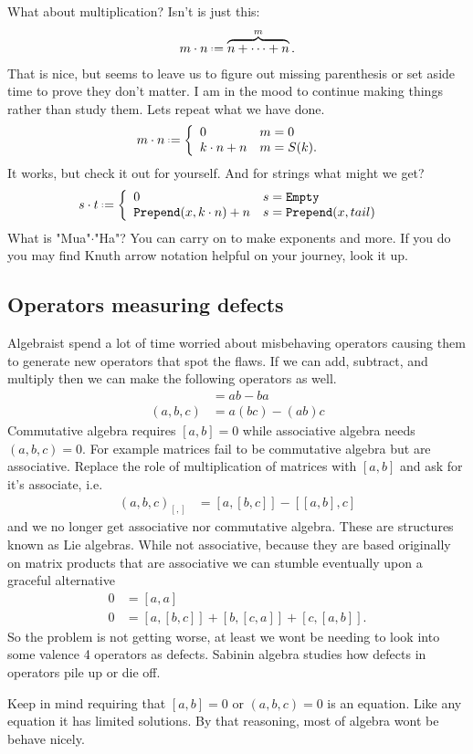 What about multiplication? Isn't is just this:
\begin{align*}
    m\cdot n\defeq \overbrace{n+\cdots +n}^m.
\end{align*}
That is nice, but seems to leave us to figure out missing parenthesis or set aside 
time to prove they don't matter.  I am in the mood to continue making things rather 
than study them.  Lets repeat what we have done.
\begin{align*}
    m\cdot n & \defeq \left\{
        \begin{array}{ll}
            0 & m=0\\
            k\cdot n+n & m=S(k).
        \end{array}
    \right.
\end{align*}
It works, but check it out for yourself.  And for strings what might we get?
\begin{align*}
    s\cdot t & \defeq \left\{
        \begin{array}{ll}
            0 & s=\texttt{Empty}\\
            \texttt{Prepend}(x,k\cdot n)+n & s=\texttt{Prepend}(x,tail)
        \end{array}
    \right.
\end{align*}
What is "Mua"$\cdot$"Ha"?
You can carry on to make exponents and more.  If you do you may find 
Knuth arrow notation helpful on your journey, look it up.

\subsection{Operators measuring defects}
Algebraist spend a lot of time worried about misbehaving operators 
causing them to generate new operators that spot the flaws.  If 
we can add, subtract, and multiply then we can make the following operators as well.
\begin{align*}
    [a,b] & = ab-ba \tag{Commutator}\\
    (a,b,c) & = a(bc)-(ab)c \tag{Associator}
\end{align*}
Commutative algebra requires $[a,b]=0$ while associative algebra needs $(a,b,c)=0$.
For example matrices fail to be commutative algebra but are associative.
Replace the role of multiplication of matrices with $[a,b]$ and ask for it's 
associate, i.e.
\begin{align*}
    (a,b,c)_{[,]} & = [a,[b,c]]-[[a,b],c]
\end{align*}
and we no longer get associative nor commutative algebra.  These are structures 
known as Lie algebras.  While not associative, because they are based originally 
on matrix products that are associative we can stumble eventually upon a 
graceful alternative
\begin{align*}
    0 & = [a,a] \tag{Alternating}\\
    0 & = [a,[b,c]]+[b,[c,a]]+[c,[a,b]].    
    \tag{Jacobi}
\end{align*}
So the problem is not getting worse, at least we wont be needing 
to look into some  valence 4 operators as defects.  Sabinin algebra 
studies how defects in operators pile up or die off.



Keep in mind requiring that $[a,b]=0$ or $(a,b,c)=0$ is an equation. 
Like any equation it has limited solutions.  By that reasoning, 
most of algebra wont be behave nicely.  


